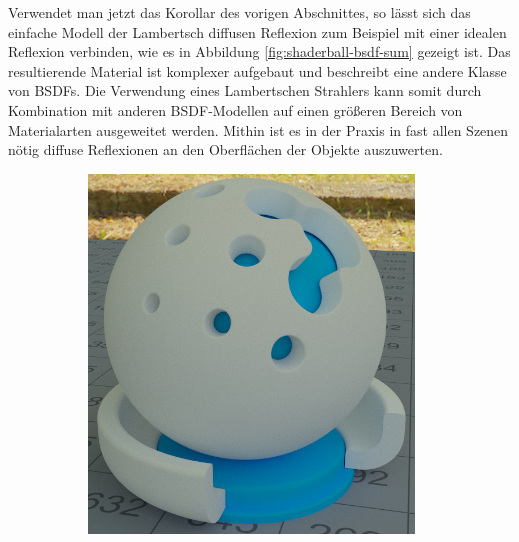 		Verwendet man jetzt das Korollar des vorigen Abschnittes, so lässt sich das einfache Modell der Lambertsch diffusen Reflexion zum Beispiel mit einer idealen Reflexion verbinden, wie es in Abbildung \ref{fig:shaderball-bsdf-sum} gezeigt ist.
		Das resultierende Material ist komplexer aufgebaut und beschreibt eine andere Klasse von BSDFs.
		Die Verwendung eines Lambertschen Strahlers kann somit durch Kombination mit anderen BSDF-Modellen auf einen größeren Bereich von Materialarten ausgeweitet werden.
		Mithin ist es in der Praxis in fast allen Szenen nötig diffuse Reflexionen an den Oberflächen der Objekte auszuwerten.

		\begin{figure}[h]
			\begin{subfigure}[b]{0.5\textwidth}
				\center
				\includegraphics[width=0.95\textwidth]{pic/shaderball-bsdf_sum-diffuse.png}
			\end{subfigure}
			\begin{subfigure}[b]{0.5\textwidth}
				\center

\end{subfigure}
\end{figure}

